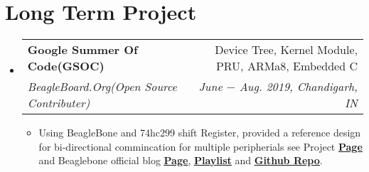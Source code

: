 \documentclass[letterpaper,11pt]{article}
\makeatletter
\newcommand{\resumeItem}[1]{
  \item\small{
    {#1 \vspace{-2pt}}
  }
}
\newcommand{\resumeSubheading}[4]{
  \vspace{-2pt}\item
    \begin{tabular*}{0.97\textwidth}[t]{l@{\extracolsep{\fill}}r}
      \textbf{#1} & #2 \\
      \textit{\small#3} & \textit{\small #4} \\
    \end{tabular*}\vspace{-9pt}
}
\newcommand{\resumeSubHeadingListStart}{\begin{itemize}[leftmargin=0.15in, label={}]}
\newcommand{\resumeSubHeadingListEnd}{\end{itemize}}
\newcommand{\resumeItemListStart}{\begin{itemize}}
\newcommand{\resumeItemListEnd}{\end{itemize}\vspace{-9pt}}
\makeatother
\begin{document}

\section{Long Term Project}
  \resumeSubHeadingListStart
    \resumeSubheading
      {Google Summer Of Code(GSOC)}{Device Tree, Kernel Module, PRU, ARMa8, Embedded C}
      {BeagleBoard.Org(Open Source Contributer) }{June $-$ Aug. 2019, Chandigarh, IN}
      \resumeItemListStart
        \resumeItem{Using BeagleBone and 74hc299 shift Register, provided a reference design for bi-directional commincation for multiple peripherials see Project \textbf{\href{https://elinux.org/Beagleboard_gsoc_2019_bi-directional_progress}{\underline{Page}}} and Beaglebone official blog \textbf{\href{https://beagleboard.org/blog/2019-06-02-beagleboard-org-community-kicks-off-gsoc-2019-with-four-projects}{\underline{Page}}}, \textbf{\href{https://www.youtube.com/watch?v=ZZDT6jNslqw&list=PLttoix_9Us2yHM4zNr08ynm4iwXZTgxam}{\underline{Playlist}}} and  \textbf{\href{https://github.com/pranav083/pocket_beagle-work}{\underline{Github Repo}}}.}
    \resumeItemListEnd
  \resumeSubHeadingListEnd\vspace{-20pt}

\end{document}
